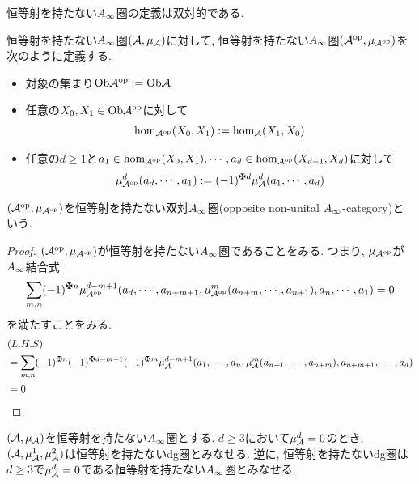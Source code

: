 \documentclass[uplatex, a4paper, 14Q, dvipdfmx]{jsarticle}
\begin{document}
恒等射を持たない$A_{\infty}$圏の定義は双対的である. 

\begin{definition}
  恒等射を持たない$A_{\infty}$圏$(\mathcal{A},\mu_{\mathcal{A}})$に対して, 恒等射を持たない$A_{\infty}$圏$(\mathcal{A}^\mathrm{op},\mu_{\mathcal{A}^\mathrm{op}})$を次のように定義する. 
  \begin{itemize}
    \item 対象の集まり$\mathrm{Ob}\mathcal{A}^\mathrm{op} := \mathrm{Ob}\mathcal{A}$
    \item 任意の$X_0, X_1 \in \mathrm{Ob}\mathcal{A}^\mathrm{op}$に対して
    \begin{align*}
      \hom_{\mathcal{A}^\mathrm{op}}(X_0,X_1) := \hom_{\mathcal{A}}(X_1,X_0)
    \end{align*}
    \item 任意の$d \geq 1$と$a_1 \in \hom_{\mathcal{A}^\mathrm{op}}(X_0,X_1), \cdots, a_d \in \hom_{\mathcal{A}^\mathrm{op}}(X_{d-1},X_d)$に対して
    \begin{align*}
      \mu^d_{\Aop}(a_d,\cdots,a_1) := (-1)^{\maltese d} \mu^d_\A(a_1,\cdots,a_d)
    \end{align*}
  \end{itemize}
  $(\mathcal{A}^\mathrm{op},\mu_{\mathcal{A}^\mathrm{op}})$を恒等射を持たない双対$A_{\infty}$圏(opposite non-unital $A_{\infty}$-category)という. 
\end{definition}

\begin{proof}
  $(\mathcal{A}^\mathrm{op},\mu_{\mathcal{A}^\mathrm{op}})$が恒等射を持たない$A_{\infty}$圏であることをみる. 
  つまり, $\mu_{\mathcal{A}^\mathrm{op}}$が$A_{\infty}$結合式
  \begin{align*}
    \sum_{m,n} (-1)^{\maltese n} \mu^{d-m+1}_{\Aop} (a_d,\cdots,a_{n+m+1}, \mu^m_{\Aop}(a_{n+m},\cdots,a_{n+1}), a_n,\cdots,a_1)
    = 0
  \end{align*}
  を満たすことをみる.
  \begin{align*}
    &(L.H.S) \\
    &= \sum_{m,n} (-1)^{\maltese n} (-1)^{\maltese d-m+1} (-1)^{\maltese m} 
    \mu^{d-m+1}_\A (a_1,\cdots,a_n, \mu^m_\A(a_{n+1},\cdots,a_{n+m}), a_{n+m+1},\cdots,a_d) \\
    &=0
  \end{align*}
\end{proof}

\begin{example}
  $(\mathcal{A},\mu_{\mathcal{A}})$を恒等射を持たない$A_{\infty}$圏とする. 
  $d \geq 3$において$\mu^d_{\mathcal{A}}=0$のとき, $(\mathcal{A},\mu^1_{\mathcal{A}},\mu^2_{\mathcal{A}})$は恒等射を持たないdg圏とみなせる. 
  逆に, 恒等射を持たないdg圏は$d \geq 3$で$\mu^d_{\mathcal{A}}=0$である恒等射を持たない$A_{\infty}$圏とみなせる. 
\end{example}
\end{document}
